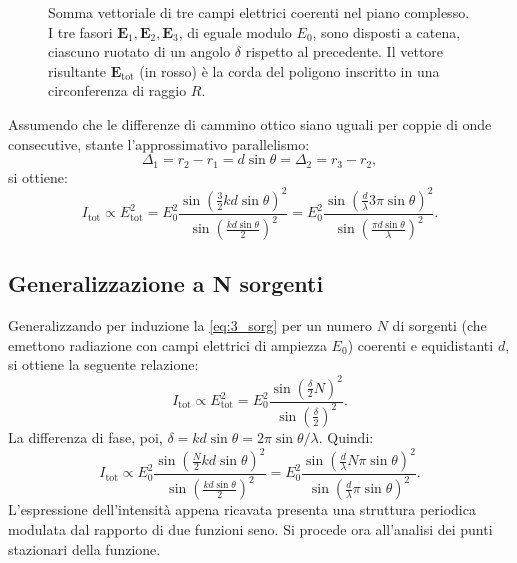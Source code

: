 \documentclass[a4paper,11pt]{report}
\begin{document}
\begin{figure}[htbp]
    \caption{Somma vettoriale di tre campi elettrici coerenti nel piano complesso. I tre fasori $\mathbf{E}_1, \mathbf{E}_2, \mathbf{E}_3$, di eguale modulo $E_0$, sono disposti a catena, ciascuno ruotato di un angolo $\delta$ rispetto al precedente. Il vettore risultante $\mathbf{E}_{\text{tot}}$ (in rosso) è la corda del poligono inscritto in una circonferenza di raggio $R$.}
    \label{fig:fasori_tre_onde}
\end{figure}

\noindent
Assumendo che le differenze di cammino ottico siano uguali per coppie di onde consecutive, stante l'approssimativo parallelismo:
\begin{equation}
\Delta_1 = r_2 - r_1 = d\sin\theta = \Delta_2 = r_3 - r_2,
\end{equation}
si ottiene:
\begin{equation}
I_{\text{tot}} \propto E_{\text{tot}}^2 = E_0^2 \frac{\sin\left(\frac{3}{2}kd\sin\theta\right)^2}{\sin\left(\frac{kd\sin\theta}{2}\right)^2} = E_0^2 \frac{\sin\left(\frac{d}{\lambda}3\pi\sin\theta\right)^2}{\sin\left(\frac{\pi d\sin\theta}{\lambda}\right)^2}.
\label{eq:3_sorg}
\end{equation}

\subsection{Generalizzazione a N sorgenti}
Generalizzando per induzione la \eqref{eq:3_sorg} per un numero $N$ di sorgenti (che emettono radiazione con campi elettrici di ampiezza $E_0$) coerenti e equidistanti $d$, si ottiene la seguente relazione:
\begin{equation}
I_{\text{tot}} \propto E_{\text{tot}}^2 = E_0^2 \frac{\sin\left(\frac{\delta}{2}N\right)^2}{\sin\left(\frac{\delta}{2}\right)^2}.
\end{equation}
La differenza di fase, poi, $\delta = kd\sin\theta = 2\pi\sin\theta/\lambda$. Quindi:
\begin{equation}
I_{\text{tot}} \propto E_0^2 \frac{\sin\left(\frac{N}{2} kd\sin\theta \right)^2}{\sin\left(\frac{kd\sin\theta}{2}\right)^2} = E_0^2 \frac{\sin\left(\frac{d}{\lambda} N\pi\sin\theta \right)^2}{\sin\left(\frac{ d}{\lambda}\pi\sin\theta\right)^2}.
\end{equation}
L'espressione dell'intensità appena ricavata presenta una struttura periodica modulata dal rapporto di due funzioni seno. Si procede ora all'analisi dei punti stazionari della funzione.
\end{document}
